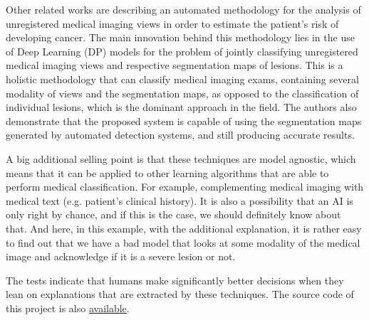 Other related works \cite{giger2013breast, carneiro2017automated} are describing an automated methodology for the analysis of unregistered medical imaging views in order to estimate the patient's risk of developing cancer. The main innovation behind this methodology lies in the use of Deep Learning (DP) models for the problem of jointly classifying unregistered medical imaging views and respective segmentation maps of lesions. This is a holistic methodology that can classify medical imaging exams, containing several modality of views and the segmentation maps, as opposed to the classification of individual lesions, which is the dominant approach in the field. The authors also demonstrate that the proposed system is capable of using the segmentation maps generated by automated detection systems, and still producing accurate results.

\clearpage

A big additional selling point is that these techniques are model agnostic, which means that it can be applied to other learning algorithms that are able to perform medical classification. For example, complementing medical imaging with medical text (e.g. patient's clinical history). It is also a possibility that an AI is only right by chance, and if this is the case, we should definitely know about that. And here, in this example, with the additional explanation, it is rather easy to find out that we have a bad model that looks at some modality of the medical image and acknowledge if it is a severe lesion or not.

The tests indicate that humans make significantly better decisions when they lean on explanations that are extracted by these techniques. The source code of this project is also \href{https://github.com/marcotcr/lime}{available}.